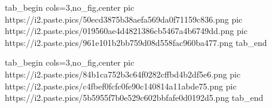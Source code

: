  
 
 
 
 
\zzSecCmtScr

\ifcmt
  tab_begin cols=3,no_fig,center
     pic https://i2.paste.pics/50ecd3875b38aefa569da0f71159c836.png
		 pic https://i2.paste.pics/019560ae4d4821386cb5467a4b6749dd.png
		 pic https://i2.paste.pics/961e101b2bb759d08d558fac960ba477.png
  tab_end
\fi

\ifcmt
  tab_begin cols=3,no_fig,center
	pic https://i2.paste.pics/84b1ca752b3c64f0282cffbd4b2df5e6.png
	pic https://i2.paste.pics/c4fbef0fcfc0fe90c140814a11abde75.png
	pic https://i2.paste.pics/5b5955f7b0e529c602bbfafe0d0192d5.png
  tab_end
\fi

